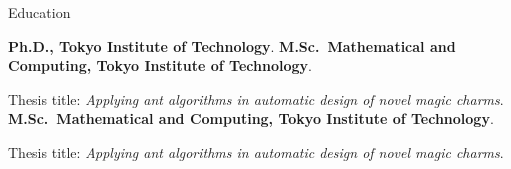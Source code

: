 \begin{rubric}{Education}

\entry*[2020-now]%
\textbf{Ph.D., Tokyo Institute of Technology}.
%
\entry*[2018-2020]%
\textbf{M.Sc.~Mathematical and Computing, Tokyo Institute of Technology}.\par
Thesis title: \emph{Applying ant algorithms in automatic design of novel magic charms}.
\entry*[2014-2018]%
\textbf{M.Sc.~Mathematical and Computing, Tokyo Institute of Technology}.\par
Thesis title: \emph{Applying ant algorithms in automatic design of novel magic charms}.
\end{rubric}